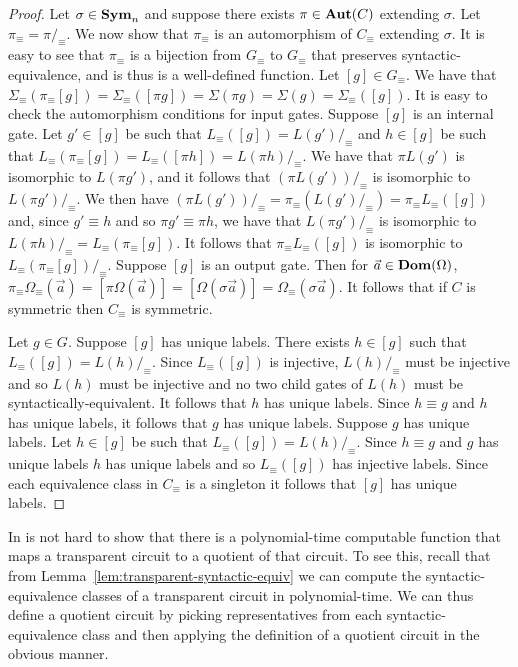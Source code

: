 \documentclass[../paper.tex]{subfiles}
\begin{document}
\begin{proof}
  Let $\sigma \in \text{\textbf{Sym}}_n$ and suppose there exists $\pi \in \text{\textbf{Aut}}(C)$ extending
  $\sigma$. Let $\pi_\equiv = \pi /_\equiv$. We now show that $\pi_\equiv$ is an
  automorphism of $C_\equiv$ extending $\sigma$. It is easy to see that
  $\pi_\equiv$ is a bijection from $G_\equiv$ to $G_\equiv$ that preserves
  syntactic-equivalence, and is thus is a well-defined function. Let $[g] \in
  G_\equiv$. We have that $\Sigma_\equiv (\pi_\equiv [g]) = \Sigma_\equiv ([\pi
  g]) = \Sigma (\pi g) = \Sigma (g) = \Sigma_\equiv ([g])$. It is easy to check
  the automorphism conditions for input gates. Suppose $[g]$ is an internal
  gate. Let $g' \in [g]$ be such that $L_\equiv([g]) = L(g') /_\equiv$ and $h
  \in [g]$ be such that $L_\equiv(\pi_\equiv[g]) = L_\equiv ([\pi h]) = L(\pi h)
  /_\equiv$. We have that $\pi L(g')$ is isomorphic to $L(\pi g')$, and it
  follows that $(\pi L(g'))/_\equiv$ is isomorphic to $L(\pi g') /_\equiv$. We
  then have $(\pi L(g'))/_\equiv = \pi_\equiv (L(g') /_\equiv) = \pi_\equiv
  L_\equiv ([g])$ and, since $g' \equiv h$ and so $\pi g' \equiv \pi h$, we have
  that $L(\pi g')/_\equiv$ is isomorphic to $L(\pi h) /_\equiv =
  L_\equiv(\pi_\equiv[g])$. It follows that $\pi_\equiv L_\equiv ([g])$ is
  isomorphic to $L_\equiv(\pi_\equiv [g]) /_\equiv$. Suppose $[g]$ is an output
  gate. Then for $\vec{a} \in \text{\textbf{Dom}} (\Omega)$, $\pi_\equiv \Omega_\equiv
  (\vec{a}) = [\pi \Omega (\vec{a})] = [\Omega (\sigma \vec{a})] = \Omega_\equiv
  (\sigma \vec{a})$. It follows that if $C$ is symmetric then $C_\equiv$ is
  symmetric.

  Let $g \in G$. Suppose $[g]$ has unique labels. There exists $h \in [g]$ such
  that $L_\equiv([g]) = L(h) /_\equiv$. Since $L_\equiv([g])$ is injective,
  $L(h) /_\equiv$ must be injective and so $L(h)$ must be injective and no two
  child gates of $L(h)$ must be syntactically-equivalent. It follows that $h$
  has unique labels. Since $h \equiv g$ and $h$ has unique labels, it follows
  that $g$ has unique labels. Suppose $g$ has unique labels. Let $h \in [g]$ be
  such that $L_\equiv([g]) = L(h) /_\equiv$. Since $h \equiv g$ and $g$ has
  unique labels $h$ has unique labels and so $L_\equiv([g])$ has injective
  labels. Since each equivalence class in $C_\equiv$ is a singleton it follows
  that $[g]$ has unique labels.
\end{proof}

In is not hard to show that there is a polynomial-time computable function that
maps a transparent circuit to a quotient of that circuit. To see this, recall
that from Lemma~\ref{lem:transparent-syntactic-equiv} we can compute the
syntactic-equivalence classes of a transparent circuit in polynomial-time. We
can thus define a quotient circuit by picking representatives from each
syntactic-equivalence class and then applying the definition of a quotient
circuit in the obvious manner.
\end{document}
